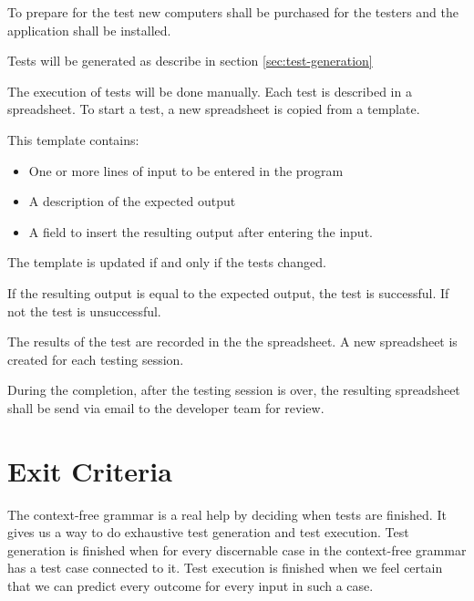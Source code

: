 \documentclass[11pt,a4paper]{article}
\begin{document}
To prepare for the test new computers shall be purchased for the
testers and the application shall be installed.

Tests will be generated as describe in section \ref{sec:test-generation}

The execution of tests will be done manually. Each test is described
in a spreadsheet. To start a test, a new spreadsheet is copied from a
template.

This template contains:

\begin{itemize}
\item One or more lines of input to be entered in the program
\item A description of the expected output
\item A field to insert the resulting output after entering the input.
\end{itemize}

The template is updated if and only if the tests  changed.

If the resulting output is equal to the expected output, the test is
successful. If not the test is unsuccessful.

The results of the test are recorded in the the spreadsheet. A new
spreadsheet is created for each testing session.

During the completion, after the testing session is over, the resulting spreadsheet shall be
send via email to the developer team for review.


\section{Exit Criteria}

The context-free grammar is a real help by deciding when tests are finished. It gives us a way to do exhaustive test generation and test execution.
Test generation is finished when for every discernable case in the context-free grammar has a test case connected to it.
Test execution is finished when we feel certain that we can predict every outcome for every input in such a case.
\end{document}

